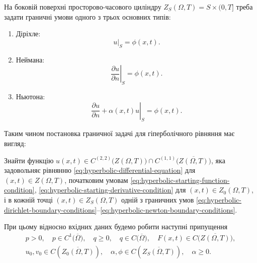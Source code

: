 На боковій поверхні просторово-часового циліндру $Z_S(\Omega, T) = S \times (0, T]$ треба задати граничні умови одного з трьох основних типів:
\begin{enumerate}
    \item Діріхле:
    \begin{equation}
        \label{eq:hyperbolic-dirichlet-boundary-conditions}
        \left. u \right|_S = \phi(x, t).
    \end{equation}
    \item Неймана:
    \begin{equation}
        \label{eq:hyperbolic-neumann-boundary-conditions}
        \left. \frac{\partial u}{\partial n} \right|_S = \phi(x, t).
    \end{equation}
    \item Ньютона:
    \begin{equation}
        \label{eq:hyperbolic-newton-boundary-conditions}
        \left. \frac{\partial u}{\partial n} + \alpha(x, t) u \right|_S = \phi(x, t).
    \end{equation}
\end{enumerate}

Таким чином постановка граничної задачі для гіперболічного рівняння має вигляд:
\begin{problem_formulation*}
    Знайти функцію $u(x, t) \in C^{(2, 2)} \Big( Z(\Omega, T) \Big) \cap C^{(1, 1)} \Big( \overline {Z(\Omega, T)} \Big)$, яка задовольняє рівнянню \eqref{eq:hyperbolic-differential-equation} для $(x, t) \in Z(\Omega, T)$, початковим умовам \eqref{eq:hyperbolic-starting-function-condition}, \eqref{eq:hyperbolic-starting-derivative-condition} для $(x, t) \in Z_0(\Omega, T)$, і в кожній точці $(x, t) \in Z_S(\Omega, T)$ одній з граничних умов \eqref{eq:hyperbolic-dirichlet-boundary-conditions}--\eqref{eq:hyperbolic-newton-boundary-conditions}.
\end{problem_formulation*}

\begin{remark}
    При цьому відносно вхідних даних будемо робити наступні припущення
    \begin{gather}
        p > 0, \quad p \in C^1 \Big( \overline \Omega \Big), \quad q \ge 0, \quad q \in C \Big( \overline \Omega \Big), \quad F(x, t) \in C \Big( \overline{Z(\Omega, T)} \Big), \\
        u_0, v_0 \in C \left( \overline{Z_0(\Omega, T)} \right), \quad \alpha, \phi \in C \left( \overline{Z_S(\Omega, T)} \right), \quad \alpha \ge 0.
    \end{gather}
\end{remark}

